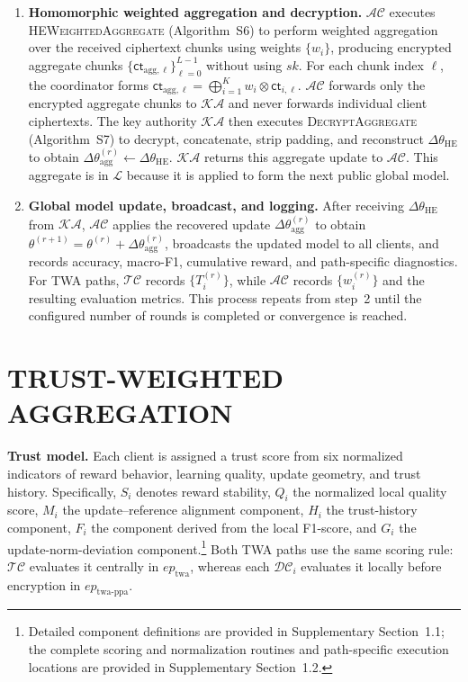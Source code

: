 \documentclass[journal]{IEEEtran}
\begin{document}
\begin{enumerate}
\item \textbf{Homomorphic weighted aggregation and decryption.}
$\mathcal{AC}$ executes \textsc{HEWeightedAggregate} (Algorithm~S6) to perform weighted aggregation
over the received ciphertext chunks using weights $\{w_i\}$, producing
encrypted aggregate chunks
$\{\mathsf{ct}_{\mathrm{agg},\ell}\}_{\ell=0}^{L-1}$ without using $sk$.
For each chunk index $\ell$, the coordinator forms
$\mathsf{ct}_{\mathrm{agg},\ell}=\bigoplus_{i=1}^{K}w_i\otimes\mathsf{ct}_{i,\ell}$.
$\mathcal{AC}$ forwards only the encrypted aggregate chunks to $\mathcal{KA}$
and never forwards individual client ciphertexts. The key authority
$\mathcal{KA}$ then executes \textsc{DecryptAggregate} (Algorithm~S7) to
decrypt, concatenate, strip padding, and reconstruct
$\Delta\theta_{\mathrm{HE}}$ to obtain $\Delta\theta_{\mathrm{agg}}^{(r)} \leftarrow
\Delta\theta_{\mathrm{HE}}$. $\mathcal{KA}$ returns this aggregate update to
$\mathcal{AC}$. This aggregate is in $\mathcal{L}$ because it is applied to
form the next public global model.

\item \textbf{Global model update, broadcast, and logging.}
After receiving $\Delta\theta_{\mathrm{HE}}$ from $\mathcal{KA}$, $\mathcal{AC}$
applies the recovered update $\Delta\theta_{\mathrm{agg}}^{(r)}$ to obtain
$\theta^{(r+1)}=\theta^{(r)}+\Delta\theta_{\mathrm{agg}}^{(r)}$, broadcasts the
updated model to all clients, and records accuracy, macro-F1, cumulative
reward, and path-specific diagnostics.
For TWA paths, $\mathcal{TC}$ records $\{T_i^{(r)}\}$,
while $\mathcal{AC}$ records $\{w_i^{(r)}\}$ and the resulting evaluation metrics.
This process repeats from step~2 until the configured number of rounds is 
completed or convergence is reached.

\end{enumerate}

\section{TRUST-WEIGHTED AGGREGATION}
\label{sec:trust_weighting}

\textbf{Trust model.}
Each client is assigned a trust score from six normalized indicators of
reward behavior, learning quality, update geometry, and trust history.
Specifically, $S_i$ denotes
reward stability, $Q_i$ the normalized local quality score, $M_i$ the
update--reference alignment component, $H_i$ the trust-history component,
$F_i$ the component derived from the local F1-score, and $G_i$ the
update-norm-deviation component.\footnote{Detailed component definitions are
provided in Supplementary Section~1.1; the complete scoring and normalization
routines and path-specific execution locations are provided in Supplementary
Section~1.2.}
Both TWA paths use the same scoring rule: $\mathcal{TC}$ evaluates it
centrally in $ep_{\mathrm{twa}}$, whereas each $\mathcal{DC}_i$ evaluates it
locally before encryption in $ep_{\mathrm{twa\text{-}ppa}}$.
\end{document}
